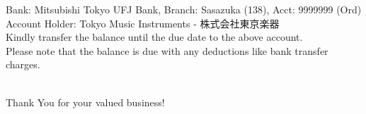\parbox{\textwidth}{
		Bank: Mitsubishi Tokyo UFJ Bank, Branch: Sasazuka (138), Acct: 9999999 (Ord) \\
		Account Holder: Tokyo Music Instruments - 株式会社東京楽器 \\
		Kindly transfer the balance until the due date to the above account.\\
		Please note that the balance is due with any deductions like bank transfer charges. \\
		\\
		\centerline{Thank You for your valued business!}
}